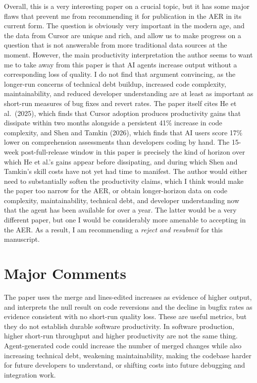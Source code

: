 \documentclass{article}
\begin{document}
Overall, this is a very interesting paper on a crucial topic, but it has some major flaws that prevent me from recommending it for publication in the AER in its current form.
The question is obviously very important in the modern age, and the data from Cursor are unique and rich, and allow us to make progress on a question that is not answerable from more traditional data sources at the moment.
However, the main productivity interpretation the author seems to want me to take away from this paper is that AI agents increase output without a corresponding loss of quality.
I do not find that argument convincing, as the longer-run concerns of technical debt buildup, increased code complexity, maintainability, and reduced developer understanding are at least as important as short-run measures of bug fixes and revert rates.
The paper itself cites He et al.\ (2025), which finds that Cursor adoption produces productivity gains that dissipate within two months alongside a persistent 41\% increase in code complexity, and Shen and Tamkin (2026), which finds that AI users score 17\% lower on comprehension assessments than developers coding by hand.
The 15-week post-full-release window in this paper is precisely the kind of horizon over which He et al.'s gains appear before dissipating, and during which Shen and Tamkin's skill costs have not yet had time to manifest.
The author would either need to substantially soften the productivity claims, which I think would make the paper too narrow for the AER, or obtain longer-horizon data on code complexity, maintainability, technical debt, and developer understanding now that the agent has been available for over a year.
The latter would be a very different paper, but one I would be considerably more amenable to accepting in the AER.
As a result, I am recommending a \textit{reject and resubmit} for this manuscript.


\section*{Major Comments}

The paper uses the merge and lines-edited increases as evidence of higher output, and interprets the null result on code reversions and the decline in bugfix rates as evidence consistent with no short-run quality loss.
These are useful metrics, but they do not establish durable software productivity.
In software production, higher short-run throughput and higher productivity are not the same thing.
Agent-generated code could increase the number of merged changes while also increasing technical debt, weakening maintainability, making the codebase harder for future developers to understand, or shifting costs into future debugging and integration work.
\end{document}
